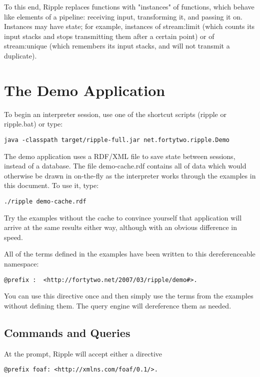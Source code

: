 \documentclass[runningheads]{llncs}
\begin{document}
To this end, Ripple replaces functions with "instances" of functions, which behave like elements of a pipeline: receiving input, transforming it, and passing it on.  Instances may have state; for example, instances of stream:limit (which counts its input stacks and stops transmitting them after a certain point) or of stream:unique (which remembers its input stacks, and will not transmit a duplicate).

\section{The Demo Application}

To begin an interpreter session, use one of the shortcut scripts (ripple or ripple.bat) or type:

\begin{verbatim}
java -classpath target/ripple-full.jar net.fortytwo.ripple.Demo
\end{verbatim}

The demo application uses a RDF/XML file to save state between sessions, instead of a database.  The file demo-cache.rdf contains all of data which would otherwise be drawn in on-the-fly as the interpreter works through the examples in this document.  To use it, type:

\begin{verbatim}
./ripple demo-cache.rdf
\end{verbatim}

Try the examples without the cache to convince yourself that application will arrive at the same results either way, although with an obvious difference in speed.

All of the terms defined in the examples have been written to this dereferenceable namespace:

\begin{verbatim}
@prefix :  <http://fortytwo.net/2007/03/ripple/demo#>.
\end{verbatim}

You can use this directive once and then simply use the terms from the examples without defining them.  The query engine will dereference them as needed.


\subsection{Commands and Queries}


At the prompt, Ripple will accept either a directive

\begin{verbatim}
@prefix foaf: <http://xmlns.com/foaf/0.1/>.
\end{verbatim}
\end{document}
